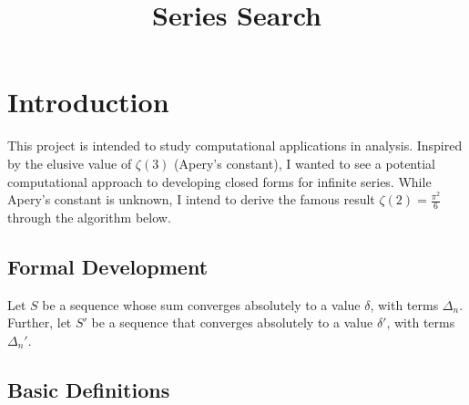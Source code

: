 \documentclass{article}
\title{Series Search}
\begin{document}
\maketitle

\section{Introduction}
This project is intended to study computational applications in analysis. 
Inspired by the elusive value of $\zeta (3)$ (Apery's constant), 
I wanted to see a potential computational approach to developing closed forms for infinite series. 
While Apery's constant is unknown, I intend to derive the famous result $\zeta (2) = \frac{{\pi}^2}{6}$ 
through the algorithm below. 

\subsection{Formal Development}

Let $S$ be a sequence whose sum converges absolutely to a value $\delta$, with terms $\Delta_n$. 
Further, let $S'$ be a sequence that converges absolutely to a value $\delta'$, with terms $\Delta_n'$. 

\subsection{Basic Definitions} 
\end{document}

